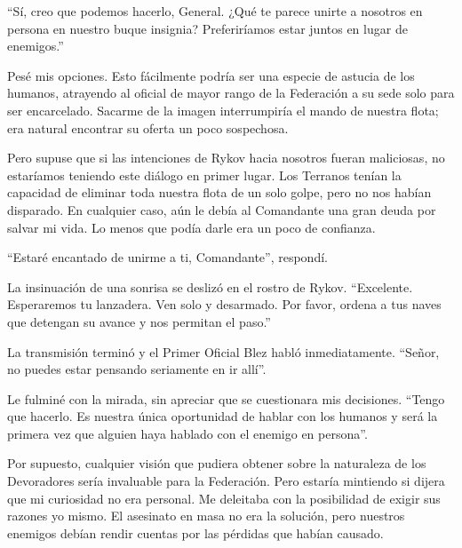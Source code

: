 ``Sí, creo que podemos hacerlo, General. ¿Qué te parece unirte a nosotros en persona en nuestro buque insignia? Preferiríamos estar juntos en lugar de enemigos.''

Pesé mis opciones. Esto fácilmente podría ser una especie de astucia de los humanos, atrayendo al oficial de mayor rango de la Federación a su sede solo para ser encarcelado. Sacarme de la imagen interrumpiría el mando de nuestra flota; era natural encontrar su oferta un poco sospechosa.

Pero supuse que si las intenciones de Rykov hacia nosotros fueran maliciosas, no estaríamos teniendo este diálogo en primer lugar. Los Terranos tenían la capacidad de eliminar toda nuestra flota de un solo golpe, pero no nos habían disparado. En cualquier caso, aún le debía al Comandante una gran deuda por salvar mi vida. Lo menos que podía darle era un poco de confianza.

“Estaré encantado de unirme a ti, Comandante”, respondí.

La insinuación de una sonrisa se deslizó en el rostro de Rykov. “Excelente. Esperaremos tu lanzadera. Ven solo y desarmado. Por favor, ordena a tus naves que detengan su avance y nos permitan el paso.”

La transmisión terminó y el Primer Oficial Blez habló inmediatamente. “Señor, no puedes estar pensando seriamente en ir allí”.

Le fulminé con la mirada, sin apreciar que se cuestionara mis decisiones. “Tengo que hacerlo. Es nuestra única oportunidad de hablar con los humanos y será la primera vez que alguien haya hablado con el enemigo en persona”.

Por supuesto, cualquier visión que pudiera obtener sobre la naturaleza de los Devoradores sería invaluable para la Federación. Pero estaría mintiendo si dijera que mi curiosidad no era personal. Me deleitaba con la posibilidad de exigir sus razones yo mismo. El asesinato en masa no era la solución, pero nuestros enemigos debían rendir cuentas por las pérdidas que habían causado.